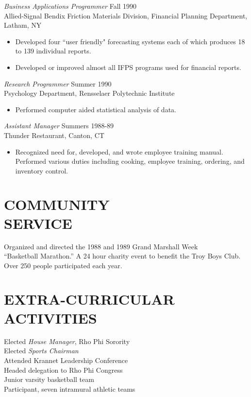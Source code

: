 \documentclass[margin, 10pt]{res} %
\begin{document}
\begin{resume}
{\sl Business Applications Programmer} \hfill Fall 1990 \\
Allied-Signal Bendix Friction Materials Division, Financial Planning Department, Latham, NY 

\begin{itemize} \itemsep -2pt %
\item Developed four ``user friendly" forecasting systems each of which produces 18 to 139 individual reports. 
\item Developed or improved almost all IFPS programs used for financial reports. 
\end{itemize}
 
{\sl Research Programmer} \hfill Summer 1990 \\
Psychology Department, Rensselaer Polytechnic Institute 
\begin{itemize} 
\item Performed computer aided statistical analysis of data. 
\end{itemize} 

{\sl Assistant Manager} \hfill Summers 1988-89 \\
Thunder Restaurant, Canton, CT
\begin{itemize}
\item Recognized need for, developed, and wrote employee training manual. Performed various duties including cooking, employee training, ordering, and inventory control. 
\end{itemize} 


\section{COMMUNITY \\ SERVICE}

Organized and directed the 1988 and 1989 Grand Marshall Week \\
``Basketball Marathon.'' A 24 hour charity event to benefit the Troy Boys Club. Over 250 people participated each year. 


\section{EXTRA-CURRICULAR \\ ACTIVITIES} 

Elected {\it House Manager}, Rho Phi Sorority \\
Elected {\it Sports Chairman} \\
Attended Krannet Leadership Conference \\
Headed delegation to Rho Phi Congress \\
Junior varsity basketball team \\
Participant, seven intramural athletic teams 

\end{resume}
\end{document}
